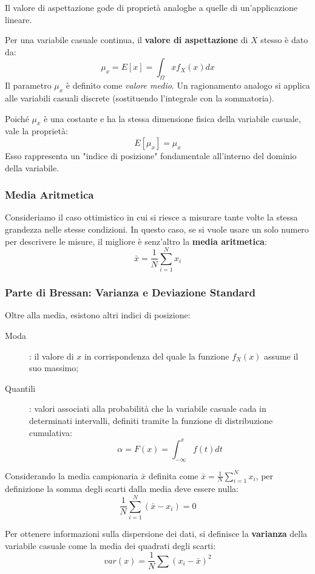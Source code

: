 \documentclass{article}
\theoremstyle{remark}
\newcommand{\ripasso}[1]{
    \subsubsection{\texorpdfstring{\color{red}Parte di Bressan: #1}{Parte di Bressan: #1}}
}
\begin{document}
Il valore di aspettazione gode di proprietà analoghe a quelle di un'applicazione lineare.

Per una variabile casuale continua, il \textbf{valore di aspettazione} di $X$ stesso è dato da:
\[
\mu_x = E[x] = \int_{\Omega}^{} x f_{X}(x) dx
\]
Il parametro $\mu_x$ è definito come \textit{valore medio}. Un ragionamento analogo si applica alle variabili casuali discrete (sostituendo l'integrale con la sommatoria).

Poiché $\mu_x$ è una costante e ha la stessa dimensione fisica della variabile casuale, vale la proprietà:
\[
E[\mu_x] = \mu_x
\]
Esso rappresenta un "indice di posizione" fondamentale all'interno del dominio della variabile.


\subsubsection{Media Aritmetica}

Consideriamo il caso ottimistico in cui si riesce a misurare tante volte la stessa grandezza nelle stesse condizioni. In questo caso, se si vuole usare un solo numero per descrivere le misure, il migliore è senz'altro la \textbf{media aritmetica}:
\begin{equation}
    \bar{x} = \frac{1}{N} \sum_{i=1}^{N} x_i
\end{equation}

\ripasso{Varianza e Deviazione Standard}

Oltre alla media, esistono altri indici di posizione:
\begin{description}
    \item[Moda]: il valore di $x$ in corrispondenza del quale la funzione $f_X(x)$ assume il suo massimo;
    \item[Quantili]: valori associati alla probabilità che la variabile casuale cada in determinati intervalli, definiti tramite la funzione di distribuzione cumulativa:
    \[ \alpha = F(x) = \int_{- \infty}^{x} f(t) dt\]
\end{description}

Considerando la media campionaria $\bar{x}$ definita come $\bar{x} = \frac{1}{N} \sum_{i=1}^{N} x_i$, per definizione la somma degli scarti dalla media deve essere nulla:
\[
\frac{1}{N}\sum_{i=1}^{N} (\bar{x}-x_i)=0
\]

Per ottenere informazioni sulla dispersione dei dati, si definisce la \textbf{varianza} della variabile casuale come la media dei quadrati degli scarti:
\[
var(x)= \frac{1}{N} \sum (x_i - \bar{x})^2
\]
\end{document}
